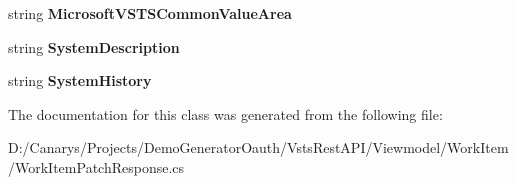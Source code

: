 \begin{DoxyCompactItemize}
string {\bfseries Microsoft\+V\+S\+T\+S\+Common\+Value\+Area}
\item 
\mbox{\label{class_vsts_rest_a_p_i_1_1_viewmodel_1_1_work_item_1_1_work_item_patch_response_1_1_fields_a42ae60434cd1825bcc03671151834de7}} 
string {\bfseries System\+Description}
\item 
\mbox{\label{class_vsts_rest_a_p_i_1_1_viewmodel_1_1_work_item_1_1_work_item_patch_response_1_1_fields_a7bffc4fb7a7d8b3b7c287559b1fafcc0}} 
string {\bfseries System\+History}
\end{DoxyCompactItemize}


The documentation for this class was generated from the following file\+:\begin{DoxyCompactItemize}
\item 
D\+:/\+Canarys/\+Projects/\+Demo\+Generator\+Oauth/\+Vsts\+Rest\+A\+P\+I/\+Viewmodel/\+Work\+Item/Work\+Item\+Patch\+Response.\+cs\end{DoxyCompactItemize}

